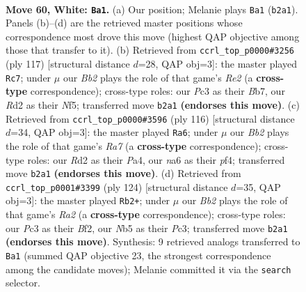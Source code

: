 \documentclass[11pt]{article}
\begin{document}
\clearpage

\begin{figure}[p]\centering
\begin{subfigure}{0.46\textwidth}\centering
\resizebox{\linewidth}{!}{%
\newchessgame
\chessboard[
  setfen={6k1/4p3/npr5/pN4p1/P1p5/2P3K1/1B1R4/8 w - - 0 60},
  showmover=false,
  pgfstyle=straightmove, color=movearrow, markmove={b2-a1}
]}
\caption{}
\end{subfigure}\hfill
\begin{subfigure}{0.46\textwidth}\centering
\resizebox{\linewidth}{!}{%
\newchessgame
\chessboard[
  setfen={3R4/1b2r3/p7/2P2nk1/RP4p1/2K4p/P4P1P/8 b - - 5 59},
  showmover=false,
  pgfstyle=straightmove, color=movearrow, markmove={e7-c7}
]}
\caption{}
\end{subfigure}
\\[4pt]
\begin{subfigure}{0.46\textwidth}\centering
\resizebox{\linewidth}{!}{%
\newchessgame
\chessboard[
  setfen={6k1/R7/1p3r1p/4Nbp1/P2P1p2/5P1P/4K3/8 w - - 1 59},
  showmover=false,
  pgfstyle=straightmove, color=movearrow, markmove={a7-a6}
]}
\caption{}
\end{subfigure}\hfill
\begin{subfigure}{0.46\textwidth}\centering
\resizebox{\linewidth}{!}{%
\newchessgame
\chessboard[
  setfen={8/2b1r1p1/5p1p/1k1p3P/6P1/2PK1P2/R4B2/8 w - - 48 63},
  showmover=false,
  pgfstyle=straightmove, color=movearrow, markmove={a2-b2}
]}
\caption{}
\end{subfigure}
\caption{\textbf{Move 60, White: \texttt{Ba1}.} (a) Our position; Melanie plays \texttt{Ba1} (\texttt{b2a1}). Panels (b)--(d) are the retrieved master positions whose correspondence most drove this move (highest QAP objective among those that transfer to it). (b) Retrieved from \texttt{ccrl\_top\_p0000\#3256} (ply 117) [structural distance $d$=28, QAP obj=3]: the master played \texttt{Rc7}; under $\mu$ our \emph{Bb2} plays the role of that game's \emph{Re2} (a \textbf{cross-type} correspondence); cross-type roles: our \emph{P}c3 as their \emph{B}b7, our \emph{R}d2 as their \emph{N}f5; transferred move \texttt{b2a1} \textbf{(endorses this move)}. (c) Retrieved from \texttt{ccrl\_top\_p0000\#3596} (ply 116) [structural distance $d$=34, QAP obj=3]: the master played \texttt{Ra6}; under $\mu$ our \emph{Bb2} plays the role of that game's \emph{Ra7} (a \textbf{cross-type} correspondence); cross-type roles: our \emph{R}d2 as their \emph{P}a4, our \emph{n}a6 as their \emph{p}f4; transferred move \texttt{b2a1} \textbf{(endorses this move)}. (d) Retrieved from \texttt{ccrl\_top\_p0001\#3399} (ply 124) [structural distance $d$=35, QAP obj=3]: the master played \texttt{Rb2+}; under $\mu$ our \emph{Bb2} plays the role of that game's \emph{Ra2} (a \textbf{cross-type} correspondence); cross-type roles: our \emph{P}c3 as their \emph{B}f2, our \emph{N}b5 as their \emph{P}c3; transferred move \texttt{b2a1} \textbf{(endorses this move)}. Synthesis: 9 retrieved analogs transferred to \texttt{Ba1} (summed QAP objective 23, the strongest correspondence among the candidate moves); Melanie committed it via the \texttt{search} selector.}
\label{fig:thought-m118}
\end{figure}
\end{document}

